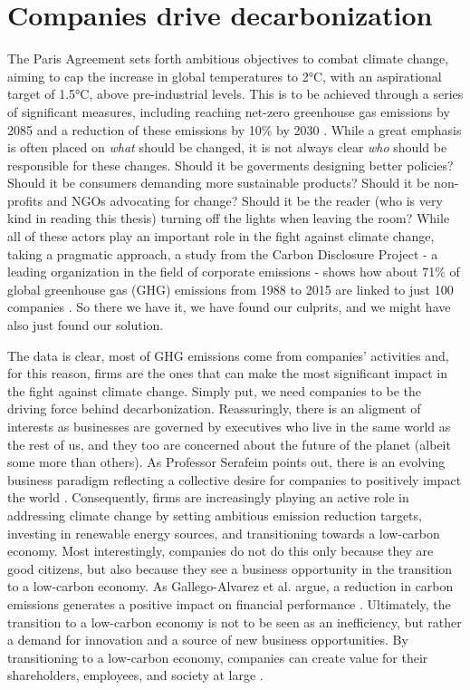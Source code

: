 \section{Companies drive decarbonization}
\noindent The Paris Agreement sets forth ambitious objectives to combat climate change, aiming to cap the increase in global temperatures to 2°C, with an aspirational target of 1.5°C, above pre-industrial levels. This is to be achieved through a series of significant measures, including reaching net-zero greenhouse gas emissions by 2085 and a reduction of these emissions by 10\% by 2030 \cite{Sanderson2016What}. While a great emphasis is often placed on \textit{what} should be changed, it is not always clear \textit{who} should be responsible for these changes. Should it be goverments designing better policies? Should it be consumers demanding more sustainable products? Should it be non-profits and NGOs advocating for change? Should it be the reader (who is very kind in reading this thesis)  turning off the lights when leaving the room? While all of these actors play an important role in the fight against climate change, taking a pragmatic approach, a study from the Carbon Disclosure Project - a leading organization in the field of corporate emissions - shows how about 71\% of global greenhouse gas (GHG) emissions from 1988 to 2015 are linked to just 100 companies \cite{Cdp2017}. So there we have it, we have found our culprits, and we might have also just found our solution. 

The data is clear, most of GHG emissions come from companies' activities and, for this reason, firms are the ones that can make the most significant impact in the fight against climate change. Simply put, we need companies to be the driving force behind decarbonization. Reassuringly, there is an aligment of interests as businesses are governed by executives who live in the same world as the rest of us, and they too are concerned about the future of the planet (albeit some more than others). As Professor Serafeim points out, there is an evolving business paradigm reflecting a collective desire for companies to positively impact the world \cite{purpose+profit}. Consequently, firms are increasingly playing an active role in addressing climate change by setting ambitious emission reduction targets, investing in renewable energy sources, and transitioning towards a low-carbon economy. Most interestingly, companies do not do this only because they are good citizens, but also because they see a business opportunity in the transition to a low-carbon economy. As Gallego-Alvarez et al. argue, a reduction in carbon emissions generates a positive impact on financial performance \cite{Gallego}.
Ultimately, the transition to a low-carbon economy is not to be seen as an inefficiency, but rather a demand for innovation and a source of new business opportunities. By transitioning to a low-carbon economy, companies can create value for their shareholders, employees, and society at large \cite{purpose+profit}. 


